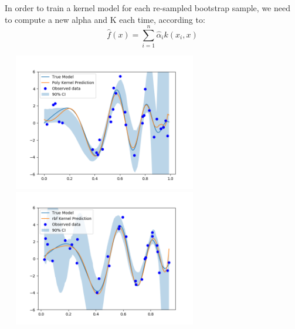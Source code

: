 \documentclass{article}
\begin{document}
In order to train a kernel model for each re-sampled bootstrap sample, we need to compute a new alpha and K each time, according to:
\[ \hat{f} (x) = \sum_{i=1}^{n} \hat{\alpha}_i k(x_i, x) \] 

\includegraphics[width=9cm, height=6cm]{plots/A3c_1.png}
\includegraphics[width=9cm, height=6cm]{plots/A3c_2.png}
\end{document}
